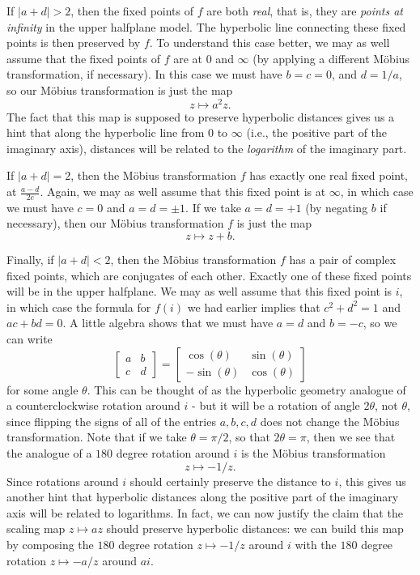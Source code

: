 If $|a+d| > 2$, then the fixed points of $f$ are both \emph{real}, that is, they are \emph{points at infinity} in the upper halfplane model. The hyperbolic line connecting these fixed points is then preserved by $f$. To understand this case better, we may as well assume that the fixed points of $f$ are at $0$ and $\infty$ (by applying a different M\"obius transformation, if necessary). In this case we must have $b = c = 0$, and $d = 1/a$, so our M\"obius transformation is just the map
\[
z \mapsto a^2z.
\]
The fact that this map is supposed to preserve hyperbolic distances gives us a hint that along the hyperbolic line from $0$ to $\infty$ (i.e., the positive part of the imaginary axis), distances will be related to the \emph{logarithm} of the imaginary part.

If $|a+d| = 2$, then the M\"obius transformation $f$ has exactly one real fixed point, at $\frac{a-d}{2c}$. Again, we may as well assume that this fixed point is at $\infty$, in which case we must have $c = 0$ and $a = d = \pm 1$. If we take $a = d = +1$ (by negating $b$ if necessary), then our M\"obius transformation $f$ is just the map
\[
z \mapsto z + b.
\]

Finally, if $|a+d| < 2$, then the M\"obius transformation $f$ has a pair of complex fixed points, which are conjugates of each other. Exactly one of these fixed points will be in the upper halfplane. We may as well assume that this fixed point is $i$, in which case the formula for $f(i)$ we had earlier implies that $c^2 + d^2 = 1$ and $ac + bd = 0$. A little algebra shows that we must have $a = d$ and $b = -c$, so we can write
\[
\begin{bmatrix}a & b\\ c & d\end{bmatrix} = \begin{bmatrix}\cos(\theta) & \sin(\theta)\\ -\sin(\theta) & \cos(\theta)\end{bmatrix}
\]
for some angle $\theta$. This can be thought of as the hyperbolic geometry analogue of a counterclockwise rotation around $i$ - but it will be a rotation of angle $2\theta$, not $\theta$, since flipping the signs of all of the entries $a,b,c,d$ does not change the M\"obius transformation. Note that if we take $\theta = \pi/2$, so that $2\theta = \pi$, then we see that the analogue of a $180$ degree rotation around $i$ is the M\"obius transformation
\[
z \mapsto -1/z.
\]
Since rotations around $i$ should certainly preserve the distance to $i$, this gives us another hint that hyperbolic distances along the positive part of the imaginary axis will be related to logarithms. In fact, we can now justify the claim that the scaling map $z \mapsto az$ should preserve hyperbolic distances: we can build this map by composing the $180$ degree rotation $z \mapsto -1/z$ around $i$ with the $180$ degree rotation $z \mapsto -a/z$ around $ai$.

